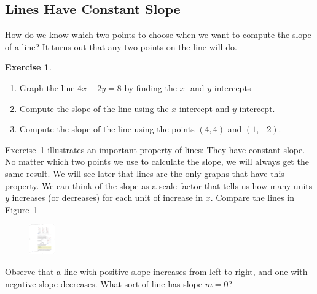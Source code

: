 \documentclass[10pt,]{book}
\theoremstyle{plain}
\theoremstyle{definition}
\theoremstyle{definition}
\theoremstyle{definition}
\theoremstyle{definition}
\newtheorem{exercise}[theorem]{Exercise}
\numberwithin{equation}{section}
\begin{document}
\subsection[Lines Have Constant Slope]{Lines Have Constant Slope}\label{subsection-21}

    How do we know which two points to choose when we want to compute the slope of a line? It turns out that any two points on the line will do.
%
\begin{exercise}\label{exercise-slope-any-points}
\leavevmode%
\begin{enumerate}[label=*\alph**]
\item\hypertarget{li-144}{}Graph the line \(4x − 2y = 8\) by finding the \(x\)- and \(y\)-intercepts\item\hypertarget{li-145}{}Compute the slope of the line using the \(x\)-intercept and \(y\)-intercept.\item\hypertarget{li-146}{}Compute the slope of the line using the points \((4, 4)\) and \((1, −2)\).\end{enumerate}
\end{exercise}
\par

    \hyperref[exercise-slope-any-points]{Exercise~\ref{exercise-slope-any-points}} illustrates an important property of lines: They have constant slope. No matter which two points we use to calculate the slope, we will always get the same result. We will see later that lines are the only graphs that have this property. We can think of the slope as a scale factor that tells us how many units \(y\) increases (or decreases) for each unit of increase in \(x\). Compare the lines in \hyperref[fig-slope-scale-factor]{Figure~\ref{fig-slope-scale-factor}}
    \leavevmode%
\begin{figure}
\centering
\includegraphics[width=0.100\textwidth,]{images/fig-slope-scale-factor.pdf}\caption{\label{fig-slope-scale-factor}}
\end{figure}

    Observe that a line with positive slope increases from left to right, and one with negative slope decreases. What sort of line has slope \(m = 0\)?
%
\typeout{************************************************}
\typeout{************************************************}
\end{document}
